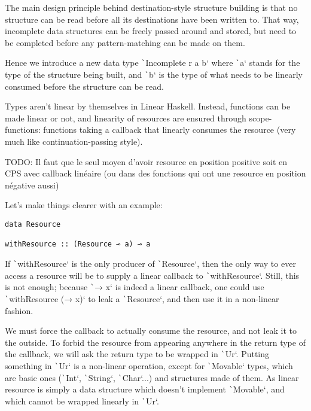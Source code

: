 \documentclass[english]{jflart}
\begin{document}
The main design principle behind destination-style structure building is that no structure can be read before all its destinations have been written to. That way, incomplete data structures can be freely passed around and stored, but need to be completed before any pattern-matching can be made on them.

Hence we introduce a new data type \texttt`Incomplete r a b` where \texttt`a` stands for the type of the structure being built, and \texttt`b` is the type of what needs to be linearly consumed before the structure can be read.

Types aren't linear by themselves in Linear Haskell. Instead, functions can be made linear or not, and linearity of resources are ensured through scope-functions: functions taking a callback that linearly consumes the resource (very much like continuation-passing style).

TODO: Il faut que le seul moyen d'avoir resource en position positive soit en CPS avec callback linéaire (ou dans des fonctions qui ont une resource en position négative aussi)

Let's make things clearer with an example:
{\small
\begin{verbatim}
data Resource

withResource :: (Resource ⊸ a) ⊸ a
\end{verbatim}
}

If \texttt`withResource` is the only producer of \texttt`Resource`, then the only way to ever access a resource will be to supply a linear callback to \texttt`withResource`. Still, this is not enough; because \texttt`\x → x` is indeed a linear callback, one could use \texttt`withResource (\x → x)` to leak a \texttt`Resource`, and then use it in a non-linear fashion.

We must force the callback to actually consume the resource, and not leak it to the outside. To forbid the resource from appearing anywhere in the return type of the callback, we will ask the return type to be wrapped in \texttt`Ur`. Putting something in \texttt`Ur` is a non-linear operation, except for \texttt`Movable` types, which are basic ones (\texttt`Int`, \texttt`String`, \texttt`Char`...) and structures made of them. As linear resource is simply a data structure which doesn't implement \texttt`Movable`, and which cannot be wrapped linearly in \texttt`Ur`.
\end{document}
